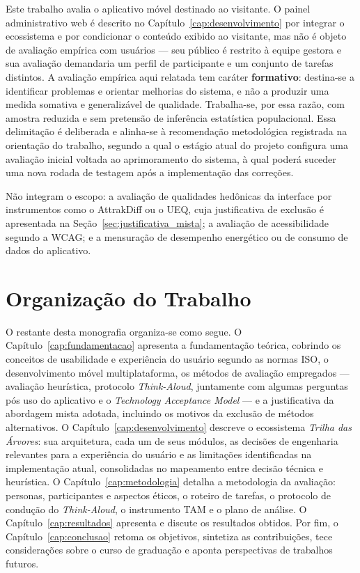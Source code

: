 Este trabalho avalia o aplicativo móvel destinado ao visitante. O painel
administrativo web é descrito no Capítulo~\ref{cap:desenvolvimento} por integrar o
ecossistema e por condicionar o conteúdo exibido ao visitante, mas não é objeto de
avaliação empírica com usuários --- seu público é restrito à equipe gestora e sua
avaliação demandaria um perfil de participante e um conjunto de tarefas distintos.
A avaliação empírica aqui relatada tem caráter \textbf{formativo}: destina-se a
identificar problemas e orientar melhorias do sistema, e não a produzir uma
medida somativa e generalizável de qualidade. Trabalha-se, por essa razão, com
amostra reduzida e sem pretensão de inferência estatística populacional. Essa
delimitação é deliberada e alinha-se à recomendação metodológica registrada na
orientação do trabalho, segundo a qual o estágio atual do projeto configura uma
avaliação inicial voltada ao aprimoramento do sistema, à qual poderá suceder uma
nova rodada de testagem após a implementação das correções.

Não integram o escopo: a avaliação de qualidades hedônicas da interface por
instrumentos como o AttrakDiff ou o UEQ, cuja justificativa de exclusão é
apresentada na Seção~\ref{sec:justificativa_mista}; a avaliação de acessibilidade
segundo a WCAG; e a mensuração de desempenho energético ou de consumo de dados do
aplicativo.

\section{Organização do Trabalho}
\label{sec:organizacao}

O restante desta monografia organiza-se como segue. O
Capítulo~\ref{cap:fundamentacao} apresenta a fundamentação teórica, cobrindo os
conceitos de usabilidade e experiência do usuário segundo as normas ISO, o
desenvolvimento móvel multiplataforma, os métodos de avaliação empregados ---
avaliação heurística, protocolo \textit{Think-Aloud}, juntamente com algumas perguntas pós uso do aplicativo
 e o \textit{Technology
Acceptance Model} --- e a justificativa da abordagem mista adotada, incluindo os
motivos da exclusão de métodos alternativos. O Capítulo~\ref{cap:desenvolvimento}
descreve o ecossistema \textit{Trilha das Árvores}: sua arquitetura, cada um de
seus módulos, as decisões de engenharia relevantes para a experiência do usuário e
as limitações identificadas na implementação atual, consolidadas no mapeamento
entre decisão técnica e heurística. O Capítulo~\ref{cap:metodologia} detalha a
metodologia da avaliação: personas, participantes e aspectos éticos, o roteiro de
tarefas, o protocolo de condução do \textit{Think-Aloud}, o instrumento TAM e o
plano de análise. O Capítulo~\ref{cap:resultados} apresenta e discute os
resultados obtidos. Por fim, o Capítulo~\ref{cap:conclusao} retoma os objetivos,
sintetiza as contribuições, tece considerações sobre o curso de graduação e aponta
perspectivas de trabalhos futuros.
